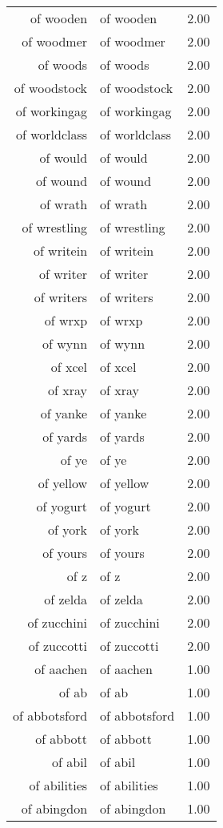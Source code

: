 \begin{table}[ht]
\begin{tabular}{rlr}
  of wooden & of wooden & 2.00 \\ 
  of woodmer & of woodmer & 2.00 \\ 
  of woods & of woods & 2.00 \\ 
  of woodstock & of woodstock & 2.00 \\ 
  of workingag & of workingag & 2.00 \\ 
  of worldclass & of worldclass & 2.00 \\ 
  of would & of would & 2.00 \\ 
  of wound & of wound & 2.00 \\ 
  of wrath & of wrath & 2.00 \\ 
  of wrestling & of wrestling & 2.00 \\ 
  of writein & of writein & 2.00 \\ 
  of writer & of writer & 2.00 \\ 
  of writers & of writers & 2.00 \\ 
  of wrxp & of wrxp & 2.00 \\ 
  of wynn & of wynn & 2.00 \\ 
  of xcel & of xcel & 2.00 \\ 
  of xray & of xray & 2.00 \\ 
  of yanke & of yanke & 2.00 \\ 
  of yards & of yards & 2.00 \\ 
  of ye & of ye & 2.00 \\ 
  of yellow & of yellow & 2.00 \\ 
  of yogurt & of yogurt & 2.00 \\ 
  of york & of york & 2.00 \\ 
  of yours & of yours & 2.00 \\ 
  of z & of z & 2.00 \\ 
  of zelda & of zelda & 2.00 \\ 
  of zucchini & of zucchini & 2.00 \\ 
  of zuccotti & of zuccotti & 2.00 \\ 
  of aachen & of aachen & 1.00 \\ 
  of ab & of ab & 1.00 \\ 
  of abbotsford & of abbotsford & 1.00 \\ 
  of abbott & of abbott & 1.00 \\ 
  of abil & of abil & 1.00 \\ 
  of abilities & of abilities & 1.00 \\ 
  of abingdon & of abingdon & 1.00 \\ 

\end{tabular}
\end{table}

